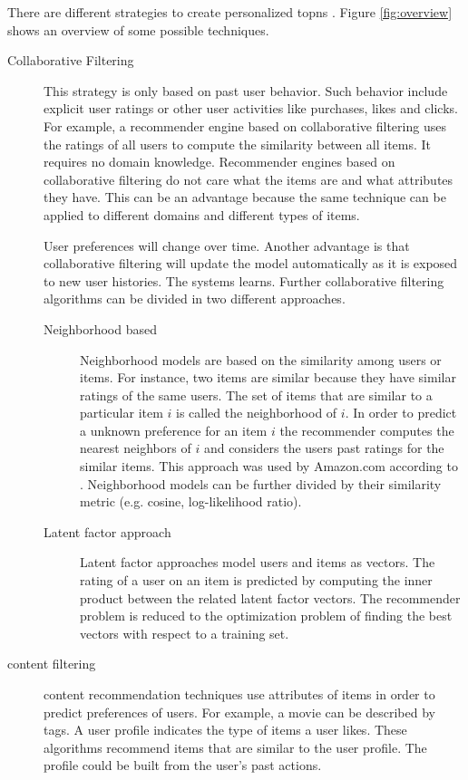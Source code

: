 There are different strategies to create personalized \glspl{topn} \cite{jannach11}. Figure \ref{fig:overview} shows an overview of some possible techniques.



\begin{description}
\item[Collaborative Filtering] This strategy is only based on past user behavior. Such behavior include explicit user ratings or other user activities like purchases, likes and clicks. For example, a recommender engine based on collaborative filtering uses the ratings of all users to compute the similarity between all items. 
It requires no domain knowledge. Recommender engines based on collaborative filtering do not care what the items are and what attributes they have. This can be an advantage because the same technique can be applied to different domains and different types of items. 

User preferences will change over time. Another advantage is that collaborative filtering will update the model automatically as it is exposed to new user histories. The systems learns.
Further collaborative filtering algorithms can be divided in two different approaches.
\begin{description}
\item[Neighborhood based] Neighborhood models are based on the similarity among users or items. For instance, two items are similar because they have similar ratings of the same users. The set of items that are similar to a particular item $i$ is called the neighborhood of $i$. In order to predict a unknown preference for an item $i$ the recommender computes the nearest neighbors of $i$ and considers the users past ratings for the similar items. This approach was used by Amazon.com according to \cite{Linden}. Neighborhood models can be further divided by their similarity metric (e.g. cosine, log-likelihood ratio).
\item[Latent factor approach] Latent factor approaches model users and items as vectors. The rating of a user on an item is predicted by computing the inner product between the related latent factor vectors. The recommender problem is reduced to the optimization problem of finding the best vectors with respect to a training set.
\end{description}
\item[\gls{content} filtering] \gls{content} recommendation techni\-ques use\- at\-tributes of items in order to predict preferences of users. For example, a movie can be described by \glspl{tag}. A user profile indicates the type of items a user likes. These algorithms recommend items that are similar to the user profile. The profile could be built from the user's past actions.
\end{description}

